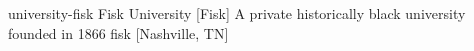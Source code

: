 \newglsXinstitution%
{university-fisk}%
{Fisk University}%
[Fisk]%
{A private historically black university founded in 1866 \cite{website:Fisk}}%
{fisk}%
[Nashville, TN]%